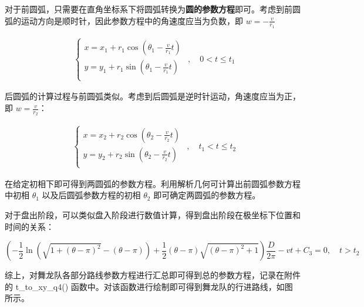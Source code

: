 \documentclass[a4paper]{article}
\begin{document}
		对于前圆弧，只需要在直角坐标系下将圆弧转换为\textbf{圆的参数方程}即可。考虑到前圆弧的运动方向是顺时针，因此参数方程中的角速度应当为负数，即 $w = -\frac{v}{r_1}$ 
		
		\begin{equation}
			\begin{aligned}
				\left\{
					\begin{array}{l}
						x = x_1 + r_1 \cos(\theta_1 - \frac{v}{r_1}t) \\
						y = y_1 + r_1 \sin(\theta_1 - \frac{v}{r_1}t) \\
					\end{array}
				\right.
			\end{aligned}
			, \quad 0 < t \le t_1
		\end{equation}
		
		后圆弧的计算过程与前圆弧类似。考虑到后圆弧是逆时针运动，角速度应当为正，即 $w = \frac{v}{r_2} $：
		
		\begin{equation}
			\begin{aligned}
				\left\{
				\begin{array}{l}
					x = x_2 + r_2 \cos(\theta_2 - \frac{v}{r_2}t) \\
					y = y_2 + r_2 \sin(\theta_2 - \frac{v}{r_2}t) \\
				\end{array}
				\right.
			\end{aligned}
			, \quad t_1 < t \le t_2
		\end{equation}
		
		在给定初相下即可得到两圆弧的参数方程。利用解析几何可计算出前圆弧参数方程中初相 $\theta_1$ 以及后圆弧参数方程的初相 $\theta_2$ 即可确定两圆弧的参数方程。
		
		对于盘出阶段，可以类似盘入阶段进行数值计算，得到盘出阶段在极坐标下位置和时间的关系：
		
		\begin{equation}
			(- \frac{1}{2}\ln(\sqrt{1 + (\theta - \pi)^2} - (\theta - \pi)) + \frac{1}{2} (\theta - \pi) \sqrt{(\theta - \pi)^2 + 1}) \frac{D}{2 \pi} - vt + C_3 = 0, \quad t > t_2
		\end{equation}
		
		综上，对舞龙队各部分路线参数方程进行汇总即可得到总的参数方程，记录在附件%
		的 t\_to\_xy\_q4() 函数中。对该函数进行绘制即可得到舞龙队的行进路线，如图%
		所示。
		
\end{document}
